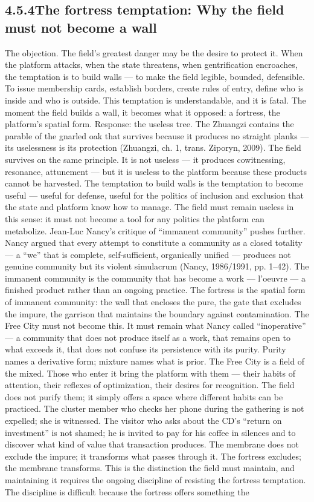 \subsection{4.5.4\quad The fortress temptation: Why the field must not become a wall}

The objection. The field’s greatest danger may be the desire to protect it. When the platform attacks, when the state threatens, when gentrification encroaches, the temptation is to build walls — to make the field legible, bounded, defensible. To issue membership cards, establish borders, create rules of entry, define who is inside and who is outside. This temptation is understandable, and it is fatal. The moment the field builds a wall, it becomes what it opposed: a fortress, the platform’s spatial form. Response: the useless tree. The Zhuangzi contains the parable of the gnarled oak that survives because it produces no straight planks — its uselessness is its protection (Zhuangzi, ch. 1, trans. Ziporyn, 2009). The field survives on the same principle. It is not useless — it produces cowitnessing, resonance, attunement — but it is useless to the platform because these products cannot be harvested. The temptation to build walls is the temptation to become useful — useful for defense, useful for the politics of inclusion and exclusion that the state and platform know how to manage. The field must remain useless in this sense: it must not become a tool for any politics the platform can metabolize. Jean-Luc Nancy’s critique of “immanent community” pushes further. Nancy argued that every attempt to constitute a community as a closed totality — a “we” that is complete, self-sufficient, organically unified — produces not genuine community but its violent simulacrum (Nancy, 1986/1991, pp. 1–42). The immanent community is the community that has become a work — l’oeuvre — a finished product rather than an ongoing practice. The fortress is the spatial form of immanent community: the wall that encloses the pure, the gate that excludes the impure, the garrison that maintains the boundary against contamination. The Free City must not become this. It must remain what Nancy called “inoperative” — a community that does not produce itself as a work, that remains open to what exceeds it, that does not confuse its persistence with its purity. Purity names a derivative form; mixture names what is prior. The Free City is a field of the mixed. Those who enter it bring the platform with them — their habits of attention, their reflexes of optimization, their desires for recognition. The field does not purify them; it simply offers a space where different habits can be practiced. The cluster member who checks her phone during the gathering is not expelled; she is witnessed. The visitor who asks about the CD’s “return on investment” is not shamed; he is invited to pay for his coffee in silences and to discover what kind of value that transaction produces. The membrane does not exclude the impure; it transforms what passes through it. The fortress excludes; the membrane transforms. This is the distinction the field must maintain, and maintaining it requires the ongoing discipline of resisting the fortress temptation. The discipline is difficult because the fortress offers something the 